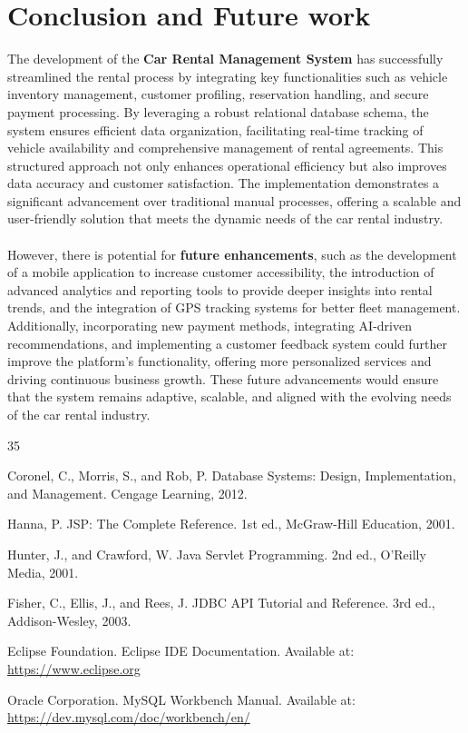 \documentclass[12pt,a4paper]{report}
\begin{document}
\chapter{Conclusion and Future work}
\p The development of the \textbf{Car Rental Management System} has successfully streamlined the rental process by integrating key functionalities such as vehicle inventory management, customer profiling, reservation handling, and secure payment processing. By leveraging a robust relational database schema, the system ensures efficient data organization, facilitating real-time tracking of vehicle availability and comprehensive management of rental agreements. This structured approach not only enhances operational efficiency but also improves data accuracy and customer satisfaction. The implementation demonstrates a significant advancement over traditional manual processes, offering a scalable and user-friendly solution that meets the dynamic needs of the car rental industry. 
\\
\\
However, there is potential for \textbf{future enhancements}, such as the development of a mobile application to increase customer accessibility, the introduction of advanced analytics and reporting tools to provide deeper insights into rental trends, and the integration of GPS tracking systems for better fleet management. Additionally, incorporating new payment methods, integrating AI-driven recommendations, and implementing a customer feedback system could further improve the platform’s functionality, offering more personalized services and driving continuous business growth. These future advancements would ensure that the system remains adaptive, scalable, and aligned with the evolving needs of the car rental industry.
\newpage
\pagestyle{plain}
\renewcommand{\bibname}{References}

\begin{thebibliography}{35}

Coronel, C., Morris, S., and Rob, P. Database Systems: Design, Implementation, and Management. Cengage Learning, 2012.

Hanna, P. JSP: The Complete Reference. 1st ed., McGraw-Hill Education, 2001.

Hunter, J., and Crawford, W. Java Servlet Programming. 2nd ed., O’Reilly Media, 2001.

Fisher, C., Ellis, J., and Rees, J. JDBC API Tutorial and Reference. 3rd ed., Addison-Wesley, 2003.

Eclipse Foundation. Eclipse IDE Documentation. Available at: \url{https://www.eclipse.org}

Oracle Corporation. MySQL Workbench Manual. Available at: \url{https://dev.mysql.com/doc/workbench/en/}

\end{thebibliography}
\end{document}
